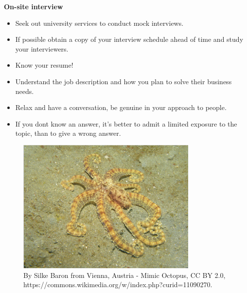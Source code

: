 \documentclass{beamer}
\begin{document}
\begin{frame}
	\center
	\textbf{On-site interview}\\
	\begin{itemize}
		\item Seek out university services to conduct mock interviews.
		\pause
		\item If possible obtain a copy of your interview schedule ahead of time and study your interviewers.
		\pause
		\item Know your resume!
		\pause
		\item Understand the job description and how \alert {you} plan to solve
		\alert {their} business needs.
		\pause
		\item Relax and have a conversation, be genuine in your approach
		to people.
		\pause
		\item If you dont know an answer, it’s better to admit a limited
		exposure to the topic, than to give a wrong answer.
	\end{itemize}
\end{frame}

\begin{frame}
		\begin{figure}
			\begin{center}
			\centering
	\includegraphics[width=0.80\textwidth]{octopus}
			\end{center}
	\caption {By Silke Baron from Vienna, Austria - Mimic Octopus, CC BY 2.0, https://commons.wikimedia.org/w/index.php?curid=11090270.}
		\end{figure}
\end{frame}
\end{document}
